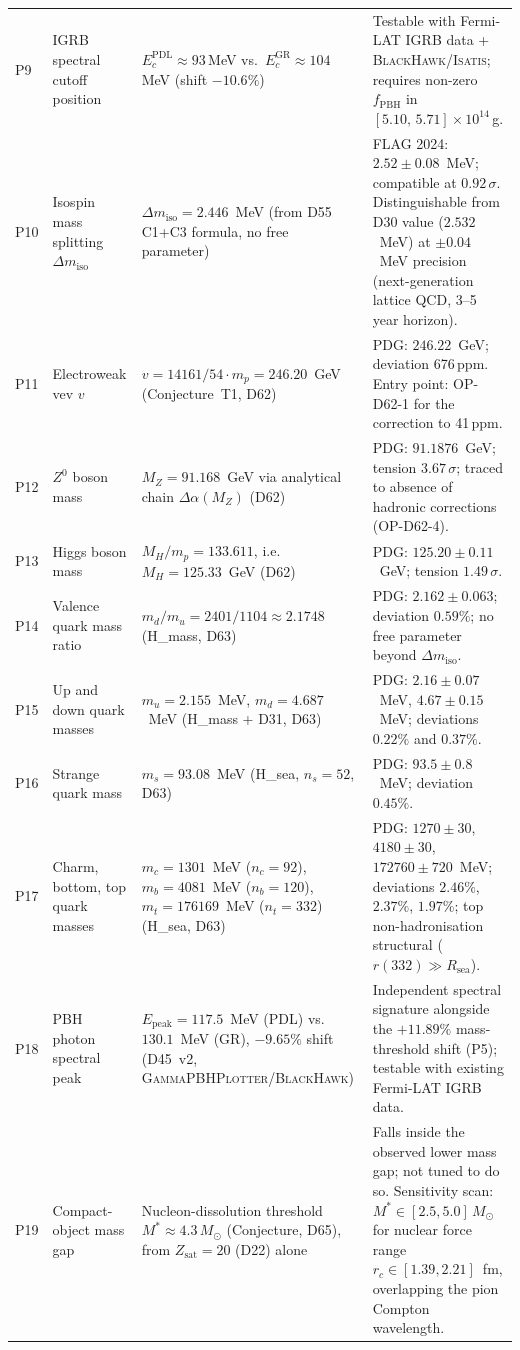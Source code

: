 \documentclass[11pt,a4paper]{article}
\theoremstyle{plain}
\theoremstyle{definition}
\theoremstyle{remark}
\newcommand{\Zsat}{Z_{\mathrm{sat}}}
\begin{document}
\begin{longtable}{L{0.5cm}L{3.2cm}L{5.2cm}L{4.2cm}}
P9 & IGRB spectral cutoff position & $E_c^{\mathrm{PDL}} \approx 93$\,MeV vs.\ $E_c^{\mathrm{GR}} \approx 104$\,MeV (shift $-10.6\%$) & Testable with Fermi-LAT IGRB data + \textsc{BlackHawk}/\textsc{Isatis}; requires non-zero $f_{\mathrm{PBH}}$ in $[5.10,\,5.71]\times10^{14}$\,g.\\[0.4em]
P10 & Isospin mass splitting $\Delta m_{\mathrm{iso}}$ & $\Delta m_{\mathrm{iso}} = 2.446$~MeV (from D55 C1+C3 formula, no free parameter) & FLAG 2024: $2.52 \pm 0.08$~MeV; compatible at $0.92\,\sigma$. Distinguishable from D30 value ($2.532$~MeV) at $\pm 0.04$~MeV precision (next-generation lattice QCD, 3--5 year horizon).\\[0.4em]
P11 & Electroweak vev $v$ & $v = 14161/54\cdot m_p = 246.20$~GeV (Conjecture~T1, D62) & PDG: $246.22$~GeV; deviation 676\,ppm. Entry point: OP-D62-1 for the correction to 41\,ppm.\\[0.4em]
P12 & $Z^0$ boson mass & $M_Z = 91.168$~GeV via analytical chain $\Delta\alpha(M_Z)$ (D62) & PDG: $91.1876$~GeV; tension $3.67\,\sigma$; traced to absence of hadronic corrections (OP-D62-4).\\[0.4em]
P13 & Higgs boson mass & $M_H/m_p = 133.611$, i.e.\ $M_H = 125.33$~GeV (D62) & PDG: $125.20 \pm 0.11$~GeV; tension $1.49\,\sigma$.\\[0.4em]
P14 & Valence quark mass ratio & $m_d/m_u = 2401/1104 \approx 2.1748$ (H\_mass, D63) & PDG: $2.162 \pm 0.063$; deviation $0.59\%$; no free parameter beyond $\Delta m_{\mathrm{iso}}$.\\[0.4em]
P15 & Up and down quark masses & $m_u = 2.155$~MeV, $m_d = 4.687$~MeV (H\_mass + D31, D63) & PDG: $2.16 \pm 0.07$~MeV, $4.67 \pm 0.15$~MeV; deviations $0.22\%$ and $0.37\%$.\\[0.4em]
P16 & Strange quark mass & $m_s = 93.08$~MeV (H\_sea, $n_s=52$, D63) & PDG: $93.5 \pm 0.8$~MeV; deviation $0.45\%$.\\[0.4em]
P17 & Charm, bottom, top quark masses & $m_c = 1301$~MeV ($n_c=92$), $m_b = 4081$~MeV ($n_b=120$), $m_t = 176169$~MeV ($n_t=332$) (H\_sea, D63) & PDG: $1270 \pm 30$, $4180 \pm 30$, $172760 \pm 720$~MeV; deviations $2.46\%$, $2.37\%$, $1.97\%$; top non-hadronisation structural ($r(332) \gg R_{\mathrm{sea}}$).\\[0.4em]
P18 & PBH photon spectral peak & $E_{\mathrm{peak}}=117.5$~MeV (PDL) vs.\ $130.1$~MeV (GR), $-9.65\%$ shift (D45~v2, \textsc{GammaPBHPlotter}/\textsc{BlackHawk}) & Independent spectral signature alongside the $+11.89\%$ mass-threshold shift (P5); testable with existing Fermi-LAT IGRB data.\\[0.4em]
P19 & Compact-object mass gap & Nucleon-dissolution threshold $M^*\approx4.3\,M_\odot$ (Conjecture, D65), from $\Zsat=20$ (D22) alone & Falls inside the observed lower mass gap; not tuned to do so. Sensitivity scan: $M^*\in[2.5,5.0]\,M_\odot$ for nuclear force range $r_c\in[1.39,2.21]$~fm, overlapping the pion Compton wavelength.\\[0.4em]
\end{longtable}
\end{document}
